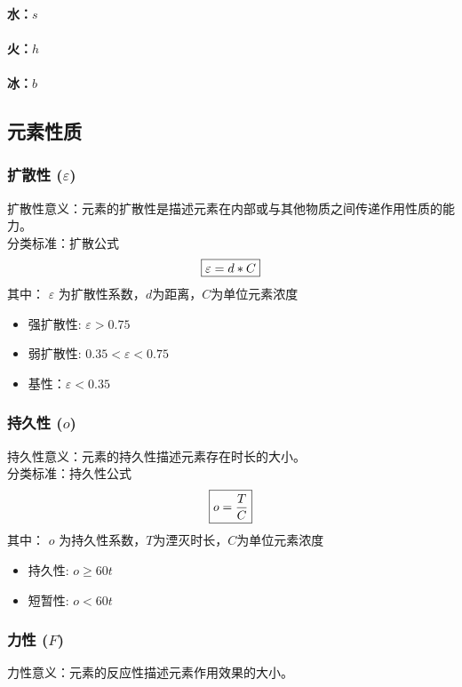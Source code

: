 \documentclass[12pt,a4paper]{article}%
\begin{document}
	\paragraph{水：$s$}
	\paragraph{火：$h$}
	\paragraph{冰：$b$}
	\subsection{元素性质}
	\subsubsection{扩散性 ($\varepsilon$)}
	扩散性意义：元素的扩散性是描述元素在内部或与其他物质之间传递作用性质的能力。\\

	分类标准：扩散公式
	\begin{equation}
		\boxed{ \varepsilon =d*C } \notag
	\end{equation}
		其中：
		$\varepsilon$ 为扩散性系数，$d$为距离，$C$为单位元素浓度
	\begin{itemize}
		\item 强扩散性:  $\varepsilon>0.75$ 
		\item 弱扩散性:  $0.35<\varepsilon<0.75$ 
		\item 基性：$\varepsilon<0.35$ 
	\end{itemize}

	\subsubsection{持久性 ($o$)}
	持久性意义：元素的持久性描述元素存在时长的大小。\\

	分类标准：持久性公式
	\begin{equation}
		\boxed{  o =\frac{T}{C} } \notag
	\end{equation}
		其中：
		$o$ 为持久性系数，$T$为湮灭时长，$C$为单位元素浓度
	\begin{itemize}
		\item 持久性:  $o\ge 60 t$ 
		\item 短暂性:  $o<60 t$ 
	\end{itemize}

	\subsubsection{力性 ($F$)}
	力性意义：元素的反应性描述元素作用效果的大小。\\
\end{document}
